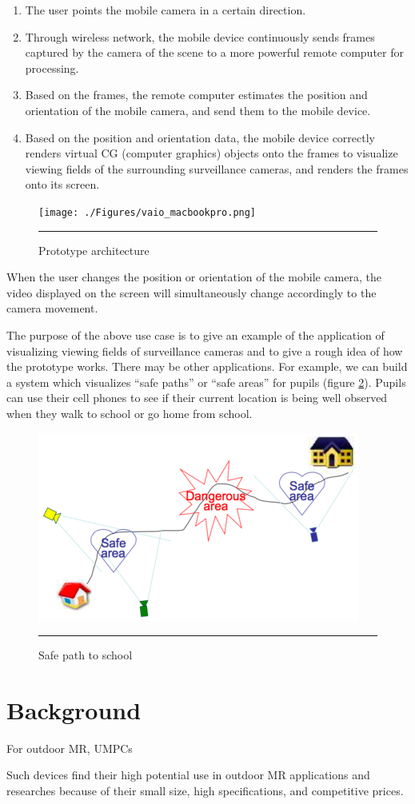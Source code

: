 \begin{enumerate}
	\item The user points the mobile camera in a certain direction.
	\item Through wireless network, the mobile device continuously sends frames captured by the camera of the scene to a more powerful remote computer for processing.
	\item Based on the frames, the remote computer estimates the position and orientation of the mobile camera, and send them to the mobile device.
	\item Based on the position and orientation data, the mobile device correctly renders virtual CG (computer graphics) objects onto the frames to visualize viewing fields of the surrounding surveillance cameras, and renders the frames onto its screen.
\end{enumerate}

\begin{figure}[htbp]
	\centering
	\texttt{[image: ./Figures/vaio\_macbookpro.png]}
	\rule{35em}{0.5pt}
	\caption[Prototype architecture]{Prototype architecture}
	\label{fig:VAIOMacBookPro}
\end{figure}

When the user changes the position or orientation of the mobile camera, the video displayed on the screen will simultaneously change accordingly to the camera movement.

The purpose of the above use case is to give an example of the application of visualizing viewing fields of surveillance cameras and to give a rough idea of how the prototype works. There may be other applications. For example, we can build a system which visualizes ``safe paths'' or ``safe areas'' for pupils (figure \ref{fig:HomeSchool}). Pupils can use their cell phones to see if their current location is being well observed when they walk to school or go home from school.

\begin{figure}[htbp]
	\centering
	\includegraphics{./Primitives/home_school.png}
	\rule{35em}{0.5pt}
	\caption[Safe path to school]{Safe path to school}
	\label{fig:HomeSchool}
\end{figure}


\section{Background}

For outdoor MR, UMPCs 

Such devices find their high potential use in outdoor MR applications and researches because of their small size, high specifications, and competitive prices.
